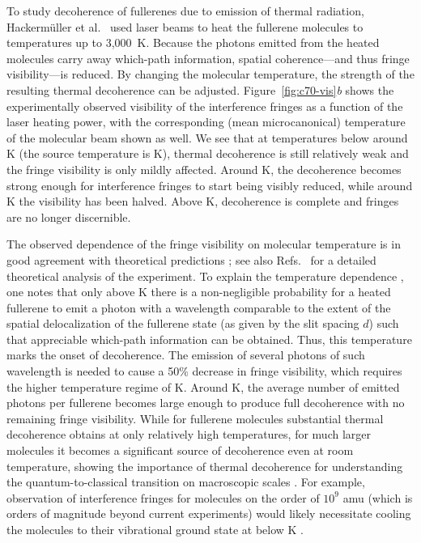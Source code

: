 \documentclass[3p,sort&compress,12pt]{elsarticle}
\begin{document}
To study decoherence of fullerenes due to emission of thermal radiation, Hackerm\"uller et al.\ \cite{Hackermuller:2004:rd} used laser beams to heat the fullerene molecules to temperatures up to 3,000~K. Because the photons emitted from the heated molecules  carry away which-path information, spatial coherence---and thus fringe visibility---is reduced. By changing the molecular temperature, the strength of the resulting thermal decoherence can be adjusted. Figure~\ref{fig:c70-vis}\emph{b} shows the experimentally observed visibility of the interference fringes as a function of the laser heating power, with the corresponding (mean microcanonical) temperature of the molecular beam shown as well. We see that at temperatures below around \unit[1,500]{K} (the source temperature is \unit[900]{K}), thermal decoherence is still relatively weak and the fringe visibility is only mildly affected. Around \unit[2,000]{K}, the decoherence becomes strong enough for interference fringes to start being visibly reduced, while around \unit[2,500]{K} the visibility has been halved. Above \unit[3,000]{K}, decoherence is complete and fringes are no longer discernible. 

The observed dependence of the fringe visibility on molecular temperature is in good agreement with theoretical predictions \cite{Hackermuller:2004:rd}; see also Refs.~\cite{Hornberger:2005:mo,Hornberger:2006:tx} for a detailed theoretical analysis of the experiment. To explain the temperature dependence \cite{Hornberger:2005:mo}, one notes that only above \unit[2,000]{K} there is a non-negligible probability for a heated fullerene to emit a photon with a wavelength comparable to the extent of the spatial delocalization of the fullerene state (as given by the slit spacing $d$) such that appreciable which-path information can be obtained. Thus, this temperature marks the onset of decoherence. The emission of several photons of such wavelength is needed to cause a 50\% decrease in fringe visibility, which requires the higher temperature regime of \unit[2,500]{K}. Around \unit[3,000]{K}, the average number of emitted photons per fullerene becomes large enough to produce full decoherence with no remaining fringe visibility. While for fullerene molecules substantial thermal decoherence obtains at only relatively high temperatures, for much larger molecules it becomes a significant source of decoherence even at room temperature, showing the importance of thermal decoherence for understanding the quantum-to-classical transition on macroscopic scales \cite{Joos:2003:jh,Hornberger:2006:tx,Schlosshauer:2007:un}. For example, observation of interference fringes for molecules on the order of $10^9$ amu (which is orders of magnitude beyond current experiments) would likely necessitate cooling the molecules to their vibrational ground state at below \unit[77]{K} \cite{Hornberger:2012:ii, Kaltenbaek:2016:pp}. 
\end{document}
